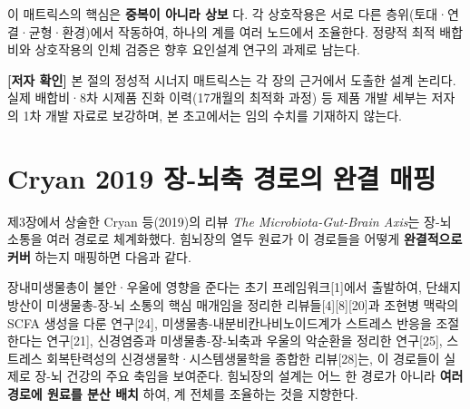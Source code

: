 \documentclass[11pt,oneside]{book}
\newenvironment{authnote}
  {\par\smallskip\begingroup\leftskip=7mm\rightskip=5mm\small\color{muted}\noindent\ignorespaces}
  {\par\endgroup\smallskip}
\begin{document}
이 매트릭스의 핵심은 \textbf{중복이 아니라 상보} 다. 각 상호작용은 서로 다른 층위(토대·연결·균형·환경)에서 작동하여, 하나의 계를 여러 노드에서 조율한다. 정량적 최적 배합비와 상호작용의 인체 검증은 향후 요인설계 연구의 과제로 남는다.

\begin{authnote}\textbf{[저자 확인]} 본 절의 정성적 시너지 매트릭스는 각 장의 근거에서 도출한 설계 논리다. 실제 배합비·8차 시제품 진화 이력(17개월의 최적화 과정) 등 제품 개발 세부는 저자의 1차 개발 자료로 보강하며, 본 초고에서는 임의 수치를 기재하지 않는다.\end{authnote}
\section{Cryan 2019 장-뇌축 경로의 완결 매핑}
제3장에서 상술한 Cryan 등(2019)의 리뷰 \textit{The Microbiota-Gut-Brain Axis}는 장-뇌 소통을 여러 경로로 체계화했다. 힘뇌장의 열두 원료가 이 경로들을 어떻게 \textbf{완결적으로 커버} 하는지 매핑하면 다음과 같다.

\vspace{2pt}\vspace{3pt}

장내미생물총이 불안·우울에 영향을 준다는 초기 프레임워크[1]에서 출발하여, 단쇄지방산이 미생물총-장-뇌 소통의 핵심 매개임을 정리한 리뷰들[4][8][20]과 조현병 맥락의 SCFA 생성을 다룬 연구[24], 미생물총-내분비칸나비노이드계가 스트레스 반응을 조절한다는 연구[21], 신경염증과 미생물총-장-뇌축과 우울의 악순환을 정리한 연구[25], 스트레스 회복탄력성의 신경생물학·시스템생물학을 종합한 리뷰[28]는, 이 경로들이 실제로 장-뇌 건강의 주요 축임을 보여준다. 힘뇌장의 설계는 어느 한 경로가 아니라 \textbf{여러 경로에 원료를 분산 배치} 하여, 계 전체를 조율하는 것을 지향한다.
\end{document}
